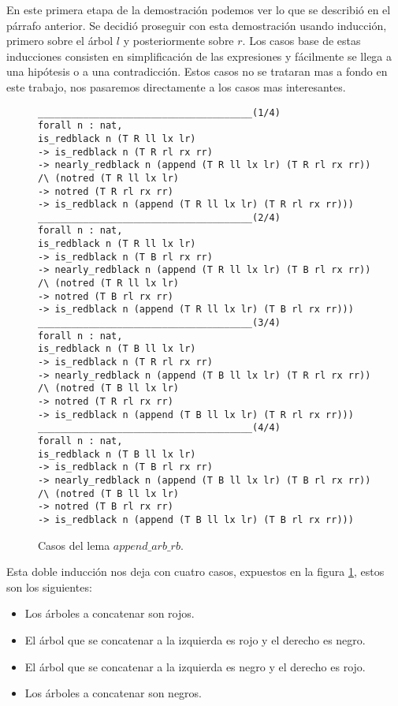 En este primera etapa de la demostraci\'on podemos ver lo que se describió en el párrafo anterior.
Se decidió proseguir con esta demostraci\'on usando inducci\'on, primero sobre el árbol $l$ y
posteriormente sobre $r$. Los casos base de estas inducciones consisten en simplificación de las
expresiones y fácilmente se llega a una hipótesis o a una contradicci\'on. Estos casos no se
trataran mas a fondo en este trabajo, nos pasaremos directamente a los casos mas interesantes.

\begin{figure}[!ht]
\centering
\captionsetup{justification=centering}
\begin{verbatim}
______________________________________(1/4)
forall n : nat,
is_redblack n (T R ll lx lr)
-> is_redblack n (T R rl rx rr)
-> nearly_redblack n (append (T R ll lx lr) (T R rl rx rr))
/\ (notred (T R ll lx lr)
-> notred (T R rl rx rr)
-> is_redblack n (append (T R ll lx lr) (T R rl rx rr)))
______________________________________(2/4)
forall n : nat,
is_redblack n (T R ll lx lr)
-> is_redblack n (T B rl rx rr)
-> nearly_redblack n (append (T R ll lx lr) (T B rl rx rr))
/\ (notred (T R ll lx lr)
-> notred (T B rl rx rr)
-> is_redblack n (append (T R ll lx lr) (T B rl rx rr)))
______________________________________(3/4)
forall n : nat,
is_redblack n (T B ll lx lr)
-> is_redblack n (T R rl rx rr)
-> nearly_redblack n (append (T B ll lx lr) (T R rl rx rr))
/\ (notred (T B ll lx lr)
-> notred (T R rl rx rr)
-> is_redblack n (append (T B ll lx lr) (T R rl rx rr)))
______________________________________(4/4)
forall n : nat,
is_redblack n (T B ll lx lr)
-> is_redblack n (T B rl rx rr)
-> nearly_redblack n (append (T B ll lx lr) (T B rl rx rr))
/\ (notred (T B ll lx lr)
-> notred (T B rl rx rr)
-> is_redblack n (append (T B ll lx lr) (T B rl rx rr)))
\end{verbatim}
\caption{Casos del lema $append\_arb\_rb$.}
\label{casos_append}
\end{figure}

Esta doble inducci\'on nos deja con cuatro casos, expuestos en la figura \ref{casos_append}, estos
son los siguientes:
\begin{itemize}
    \item Los \'arboles a concatenar son rojos.
    \item El \'arbol que se concatenar a la izquierda es rojo y el derecho es negro.
    \item El \'arbol que se concatenar a la izquierda es negro y el derecho es rojo.
    \item Los \'arboles a concatenar son negros.
\end{itemize}

